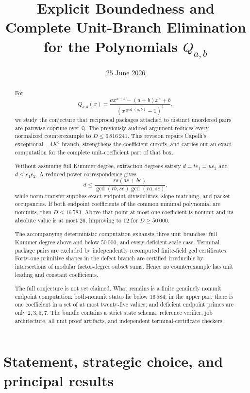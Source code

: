 \documentclass[11pt]{article}
\title{Explicit Boundedness and Complete Unit-Branch Elimination\\
for the Polynomials \(Q_{a,b}\)}
\author{}
\date{25 June 2026}
\theoremstyle{definition}
\newcommand{\Q}{\mathbb Q}
\begin{document}
\maketitle

\begin{abstract}
For
\[
 Q_{a,b}(x)=
 \frac{a x^{a+b}-(a+b)x^a+b}
 {(x^{\gcd(a,b)}-1)^2},
\]
we study the conjecture that reciprocal packages attached to distinct
unordered pairs are pairwise coprime over \(\Q\).  The previously audited
argument reduces every normalized counterexample to
\(D\leq6\,816\,241\).  This revision repairs Capelli's exceptional
\(-4K^4\) branch, strengthens the coefficient cutoffs, and carries out an
exact computation for the complete unit-coefficient part of that box.

Without assuming full Kummer degree, extraction degrees satisfy
\(d=te_1=ue_2\) and \(d\leq e_1e_2\).  A reduced power correspondence gives
\[
 d\leq\frac{rs(ae+bc)}{\gcd(rb,se)\gcd(ra,sc)},
\]
while norm transfer supplies exact endpoint divisibilities, slope matching,
and packet occupancies.  If both endpoint coefficients of the common minimal
polynomial are nonunits, then \(D\leq16\,583\).  Above that point at most
one coefficient is nonunit and its absolute value is at most \(26\), improving
to \(12\) for \(D\geq50\,000\).

The accompanying deterministic computation exhausts three unit branches:
full Kummer degree above and below \(50\,000\), and every deficient-scale
case.  Terminal package pairs are excluded by independently recomputed
finite-field gcd certificates.  Forty-one primitive shapes in the defect
branch are certified irreducible by intersections of modular factor-degree
subset sums.  Hence no counterexample has unit leading and constant
coefficients.

The full conjecture is not yet claimed.  What remains is a finite genuinely
nonunit endpoint computation: both-nonunit states lie below \(16\,584\); in
the upper part there is one coefficient in a set of at most twenty-five
values; and deficient endpoint primes are only \(2,3,5,7\).  The bundle
contains a strict state schema, reference verifier, job architecture, all
unit proof artifacts, and independent terminal-certificate checkers.
\end{abstract}

\tableofcontents

\section{Statement, strategic choice, and principal results}
\end{document}
